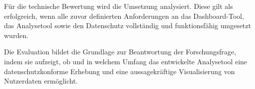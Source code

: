 Für die technische Bewertung wird die Umsetzung analysiert. Diese gilt als erfolgreich, wenn alle zuvor definierten Anforderungen an das Dashboard-Tool, das Analysetool sowie den Datenschutz vollständig und funktionsfähig umgesetzt wurden.

Die Evaluation bildet die Grundlage zur Beantwortung der Forschungsfrage, indem sie aufzeigt, ob und in welchem Umfang das entwickelte Analysetool eine datenschutzkonforme Erhebung und eine aussagekräftige Visualisierung von Nutzerdaten ermöglicht.
